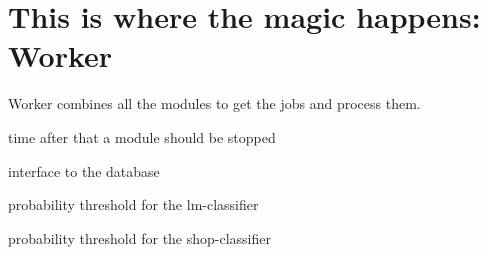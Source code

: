 \documentclass[letterpaper,10pt,english]{sphinxmanual}
\begin{document}
\section{This is where the magic happens: Worker}
\label{\detokenize{api:this-is-where-the-magic-happens-worker}}\label{\detokenize{api:module-worker}}

\begin{fulllineitems}
\label{\detokenize{api:worker.Worker}}
Worker combines all the modules to get the jobs and process them.

\begin{fulllineitems}
\label{\detokenize{api:worker.Worker._delay_module}}
time after that a module should be stopped

\end{fulllineitems}


\begin{fulllineitems}
\label{\detokenize{api:worker.Worker._interface}}
interface to the database

\end{fulllineitems}


\begin{fulllineitems}
\label{\detokenize{api:worker.Worker._lm_theta}}
probability threshold for the lm-classifier

\end{fulllineitems}


\begin{fulllineitems}
\label{\detokenize{api:worker.Worker._shop_theta}}
probability threshold for the shop-classifier

\end{fulllineitems}



\end{fulllineitems}
\end{document}
